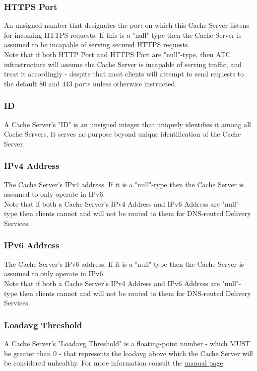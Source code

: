 \subsubsection{HTTPS Port}
An unsigned number that designates the port on which this Cache Server listens
for incoming HTTPS requests. If this is a "null"-type then the Cache Server is
assumed to be incapable of serving secured HTTPS requests.\\
Note that if both HTTP Port and HTTPS Port are "null"-type, then ATC
infrastructure will assume the Cache Server is incapable of serving traffic, and
treat it accordingly - despite that most clients will attempt to send requests
to the default 80 and 443 ports unless otherwise instructed.

\subsubsection{ID}
A Cache Server's "ID" is an unsigned integer that uniquely identifies it among
all Cache Servers. It serves no purpose beyond unique identification of the
Cache Server.

\subsubsection{IPv4 Address}
The Cache Server's IPv4 address. If it is a "null"-type then the Cache Server is
assumed to only operate in IPv6.\\
Note that if both a Cache Server's IPv4 Address and IPv6 Address are "null"-type
then clients cannot and will not be routed to them for DNS-routed Delivery
Services.

\subsubsection{IPv6 Address}
The Cache Server's IPv6 address. If it is a "null"-type then the Cache Server is
assumed to only operate in IPv6.\\
Note that if both a Cache Server's IPv4 Address and IPv6 Address are "null"-type
then clients cannot and will not be routed to them for DNS-routed Delivery
Services.

\subsubsection{Loadavg Threshold}
A Cache Server's "Loadavg Threshold" is a floating-point number - which MUST be
greater than 0 - that represents the loadavg above which the Cache Server will
be considered unhealthy. For more information consult the
\href{https://linux.die.net/man/3/getloadavg}{ manual page}.

